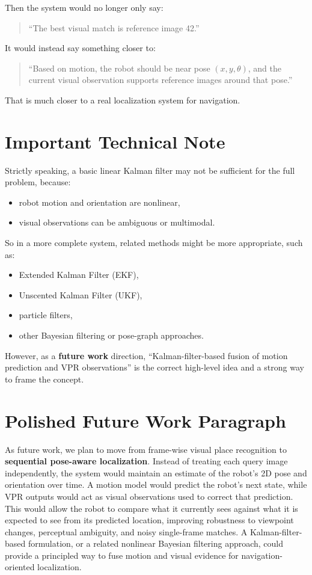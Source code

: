 \documentclass[11pt]{article}
\begin{document}
Then the system would no longer only say:
\begin{quote}
``The best visual match is reference image 42.''
\end{quote}

It would instead say something closer to:
\begin{quote}
``Based on motion, the robot should be near pose $(x, y, \theta)$, and the current visual observation supports reference images around that pose.''
\end{quote}

That is much closer to a real localization system for navigation.

\section*{Important Technical Note}
Strictly speaking, a basic linear Kalman filter may not be sufficient for the full problem, because:
\begin{itemize}[leftmargin=*]
  \item robot motion and orientation are nonlinear,
  \item visual observations can be ambiguous or multimodal.
\end{itemize}

So in a more complete system, related methods might be more appropriate, such as:
\begin{itemize}[leftmargin=*]
  \item Extended Kalman Filter (EKF),
  \item Unscented Kalman Filter (UKF),
  \item particle filters,
  \item other Bayesian filtering or pose-graph approaches.
\end{itemize}

However, as a \textbf{future work} direction, ``Kalman-filter-based fusion of motion prediction and VPR observations'' is the correct high-level idea and a strong way to frame the concept.

\section*{Polished Future Work Paragraph}
As future work, we plan to move from frame-wise visual place recognition to \textbf{sequential pose-aware localization}. Instead of treating each query image independently, the system would maintain an estimate of the robot's 2D pose and orientation over time. A motion model would predict the robot's next state, while VPR outputs would act as visual observations used to correct that prediction. This would allow the robot to compare what it currently sees against what it is expected to see from its predicted location, improving robustness to viewpoint changes, perceptual ambiguity, and noisy single-frame matches. A Kalman-filter-based formulation, or a related nonlinear Bayesian filtering approach, could provide a principled way to fuse motion and visual evidence for navigation-oriented localization.
\end{document}
